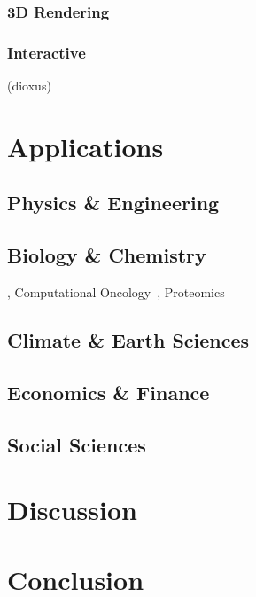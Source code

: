\documentclass{article}
\begin{document}
\subsubsection{3D Rendering}
\subsubsection{Interactive}
(dioxus)

\section{Applications}
\label{section:applications}

\subsection{Physics \& Engineering}
\subsection{Biology \& Chemistry}
\cite{Pleyer2024}, Computational Oncology~\cite{Köster2025}, Proteomics~\cite{Anechitoaie2024}
\subsection{Climate \& Earth Sciences}
\subsection{Economics \& Finance}
\subsection{Social Sciences}

\section{Discussion}
\label{section:discussion}

\section{Conclusion}
\label{section:conclusion}

\printbibliography
\end{document}
